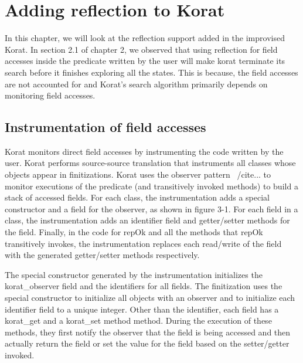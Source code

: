 \chapter{Adding reflection to Korat}
In this chapter, we will look at the reflection support added in the improvised Korat. In section 2.1 of chapter 2, we observed that using reflection for field accesses inside the predicate written by the user will make korat terminate its search before it finishes exploring all the states. This is because, the field accesses are not accounted for and Korat’s search algorithm primarily depends on monitoring field accesses.

\section{Instrumentation of field accesses}
Korat monitors direct field accesses by instrumenting the code written by the user. Korat performs source-source translation that instruments all classes whose objects appear in finitizations. Korat uses the observer pattern ~/cite{...} to monitor executions of the predicate (and transitively invoked methods) to build a stack of accessed fields. For each class, the instrumentation adds a special constructor and a field for the observer, as shown in figure 3-1. For each field in a class, the instrumentation adds an identifier field and getter/setter methods for the field. Finally, in the code for repOk and all the methods that repOk transitively invokes, the instrumentation replaces each read/write of the field with the generated getter/setter methods respectively.

\par
The special constructor generated by the instrumentation initializes the korat\_observer field and the identifiers for all fields. The finitization uses the special constructor to initialize all objects with an observer and to initialize each identifier field to a unique integer. Other than the identifier, each field has a korat\_get and a korat\_set method method. During the execution of these methods, they first notify the observer that the field is being accessed and then actually return the field or set the value for the field based on the setter/getter invoked.


